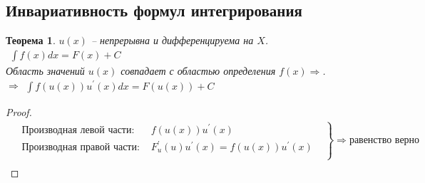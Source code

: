 \documentclass[12pt, fleqn]{book}
\begin{document}
	\subsection{Инвариативность формул интегрирования}
	\newtheorem*{Integral of a complex function}{Теорема}
	\begin{Integral of a complex function}
		$u(x)$ -- непрерывна и дифференцируема на $X$. \\$\begin{gathered}
			\int f(x)dx=F(x)+C
		\end{gathered}$\\
		Область значений $u(x)$ совпадает с областью определения $f(x) \Rightarrow$.\\
		$\Rightarrow\begin{gathered}
		\int f\left(u\left(x\right)\right)u^\prime\left(x\right)dx=F\left(u\left(x\right)\right)+C
		\end{gathered}$
	\end{Integral of a complex function}
	\begin{proof}
		\begin{multline*}
			\left.
			\begin{aligned}
				&\text{Производная левой части: }& f\left(u\left(x\right)\right)u^\prime\left(x\right)&\\
				&\text{Производная правой части: }& F_u^\prime\left(u\right)u^\prime\left(x\right)=f\left(u\left(x\right)\right)u^\prime\left(x\right)&\\
			\end{aligned}
			\right\} \Rightarrow \text{равенство верно}\\
		\end{multline*}
	\end{proof}
\end{document}
